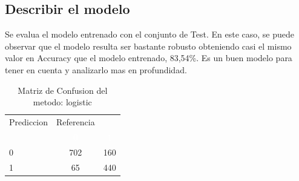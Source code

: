 \documentclass[]{article}
\begin{document}
\hypertarget{describir-el-modelo-2}{%
\subsection{Describir el modelo}\label{describir-el-modelo-2}}

Se evalua el modelo entrenado con el conjunto de Test. En este caso, se
puede observar que el modelo resulta ser bastante robusto obteniendo
casi el mismo valor en Accuracy que el modelo entrenado, 83,54\%. Es un
buen modelo para tener en cuenta y analizarlo mas en profundidad.

\begin{table}[!h]

\caption{\label{tab:MatrizConf_logistic}Matriz de Confusion del metodo: logistic }
\centering
\begin{tabular}[t]{lcc}
\toprule
\multicolumn{1}{c}{Prediccion} & \multicolumn{1}{c}{Referencia} & \multicolumn{1}{c}{ } \\
\cmidrule(l{3pt}r{3pt}){1-1} \cmidrule(l{3pt}r{3pt}){2-2}
\rowcolor{black}  \multicolumn{1}{c}{\textcolor{white}{\textbf{ }}} & \multicolumn{1}{c}{\textcolor{white}{\textbf{0}}} & \multicolumn{1}{c}{\textcolor{white}{\textbf{1}}}\\
\midrule
\rowcolor{gray!6}  0 & 702 & 160\\
1 & 65 & 440\\
\bottomrule
\end{tabular}
\end{table}
\end{document}
